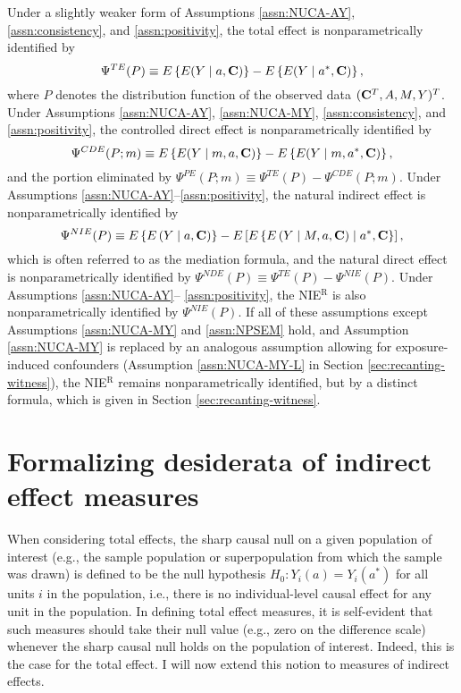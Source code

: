 \documentclass[12pt]{article}
\begin{document}
Under a slightly weaker form of Assumptions \ref{assn:NUCA-AY}, \ref{assn:consistency}, and \ref{assn:positivity}, the total effect is nonparametrically identified by
\[\Psi^{TE}(P) \equiv E\left\{E(Y\mid a, {\bf C})\right\} - E\left\{E(Y\mid a^*, {\bf C})\right\},\]
where $P$ denotes the distribution function of the observed data $({\bf C}^T,A,M,Y)^T$. Under Assumptions \ref{assn:NUCA-AY}, \ref{assn:NUCA-MY}, \ref{assn:consistency}, and \ref{assn:positivity}, the controlled direct effect is nonparametrically identified by 
\[\Psi^{CDE}(P;m) \equiv E\left\{E(Y\mid m, a, {\bf C})\right\} - E\left\{E(Y\mid m, a^*, {\bf C})\right\},\]
and the portion eliminated by $\Psi^{PE}(P;m) \equiv \Psi^{TE}(P) - \Psi^{CDE}(P;m)$. %
Under Assumptions \ref{assn:NUCA-AY}--\ref{assn:positivity}, the natural indirect effect is nonparametrically identified by
\[\Psi^{NIE}(P) \equiv E\left\{E\left(Y\mid a, {\bf C}\right)\right\} - E\left[E\left\{E\left(Y\mid M, a, {\bf C}\right)\mid a^*, {\bf C}\right\}\right],\]
which is often referred to as the mediation formula, and the natural direct effect is nonparametrically identified by $\Psi^{NDE}(P) \equiv \Psi^{TE}(P) - \Psi^{NIE}(P)$. Under Assumptions \ref{assn:NUCA-AY}--%
\ref{assn:positivity}, the NIE$^\text{R}$ is also nonparametrically identified by $\Psi^{NIE}(P)$. If all of these assumptions except Assumptions \ref{assn:NUCA-MY} and \ref{assn:NPSEM} hold, and Assumption \ref{assn:NUCA-MY} is replaced by an analogous assumption allowing for exposure-induced confounders (Assumption \ref{assn:NUCA-MY-L} in Section \ref{sec:recanting-witness}), the NIE$^\text{R}$ remains nonparametrically identified, but by a distinct formula, which is given in Section \ref{sec:recanting-witness}.

\section{Formalizing desiderata of indirect effect measures}
\label{sec:snc}

When considering total effects, the sharp causal null on a given population of interest (e.g., the sample population or superpopulation from which the sample was drawn) is defined to be the null hypothesis $H_0:Y_i(a)=Y_i(a^*)$ for all units $i$ in the population, i.e., there is no individual-level causal effect for any unit in the population. In defining total effect measures, it is self-evident that such measures should take their null value (e.g., zero on the difference scale) whenever the sharp causal null holds on the population of interest. Indeed, this is the case for the total effect. I will now extend this notion to measures of indirect effects.
\end{document}
